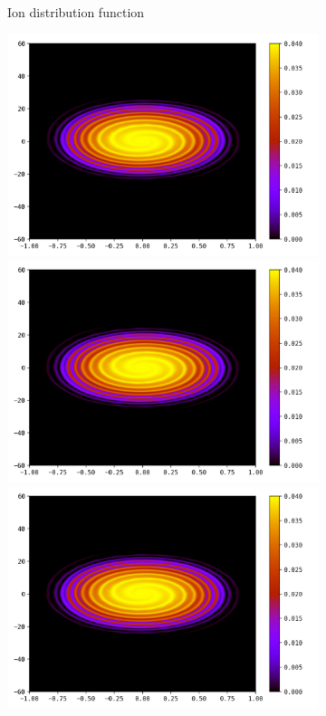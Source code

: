 \documentclass{article}
\numberwithin{equation}{section}
\newcommand{\imh}{\textheight} %
\newcommand{\imw}{\textwidth} %
\begin{document}
\begin{figure}
\begin{subfigure}{\textwidth}
		\caption{Ion distribution function} 
	\end{subfigure}
	\begin{subfigure}{\textwidth}
		\centering
		\includegraphics[height=\imh,width=\imw]{images/feT20_run5af.png}
		\includegraphics[height=\imh,width=\imw]{images/feT20_run5af_2.png}
		\includegraphics[height=\imh,width=\imw]{images/feT20_run5af_3.png}

\end{subfigure}
\end{figure}
\end{document}
